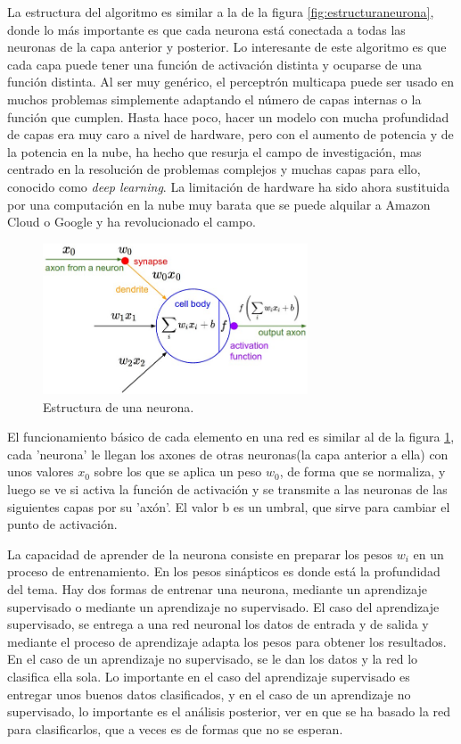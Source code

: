 \documentclass[12pt]{article}
\numberwithin{equation}{section}
\begin{document}
La estructura del algoritmo es similar a la de la figura \ref{fig:estructuraneurona}, donde lo más importante es que cada neurona está conectada a todas las neuronas de la capa anterior y posterior. Lo interesante de este algoritmo es que cada capa puede tener una función de activación distinta y ocuparse de una función distinta. Al ser muy genérico, el perceptrón multicapa puede ser usado en muchos problemas simplemente adaptando el número de capas internas o la función que cumplen. Hasta hace poco, hacer un modelo con mucha profundidad de capas era muy caro a nivel de hardware, pero con el aumento de potencia y de la potencia en la nube, ha hecho que resurja el campo de investigación, mas centrado en la resolución de problemas complejos y muchas capas para ello, conocido como \textit{deep learning}. La limitación de hardware ha sido ahora sustituida por una computación en la nube muy barata que se puede alquilar a Amazon Cloud o Google y ha revolucionado el campo.

\begin{figure}[h]
    \centering
    \includegraphics[width=0.7\textwidth]{neuron.jpg}
    \caption{Estructura de una neurona.}
    \label{fig:estructura}
\end{figure}

El funcionamiento básico de cada elemento en una red es similar al de la figura \ref{fig:estructura}, cada 'neurona' le llegan los axones de otras neuronas(la capa anterior a ella) con unos valores $x_0$ sobre los que se aplica un peso $w_0$, de forma que se normaliza, y luego se ve si activa la función de activación y se transmite a las neuronas de las siguientes capas por su 'axón'. El valor b es un umbral, que sirve para cambiar el punto de activación.

La capacidad de aprender de la neurona consiste en preparar los pesos $w_i$ en un proceso de entrenamiento. En los pesos sinápticos es donde está la profundidad del tema. Hay dos formas de entrenar una neurona, mediante un aprendizaje supervisado o mediante un aprendizaje no supervisado. El caso del aprendizaje supervisado, se entrega a una red neuronal los datos de entrada y de salida y mediante el proceso de aprendizaje adapta los pesos para obtener los resultados. En el caso de un aprendizaje no supervisado, se le dan los datos y la red lo clasifica ella sola. Lo importante en el caso del aprendizaje supervisado es entregar unos buenos datos clasificados, y en el caso de un aprendizaje no supervisado, lo importante es el análisis posterior, ver en que se ha basado la red para clasificarlos, que a veces es de formas que no se esperan.
\end{document}
